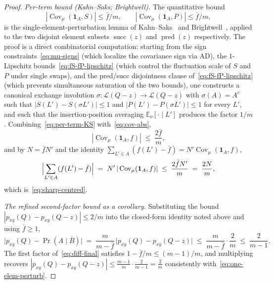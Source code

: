 \begin{proof}
\emph{Per-term bound (Kahn--Saks; Brightwell).} The quantitative
bound
\begin{equation}\label{eq:per-term-KS}
  |\operatorname{Cov}_\mu(\mathbf{1}_A, S)| \le \bar f/m,
  \qquad
  |\operatorname{Cov}_\mu(\mathbf{1}_A, P)| \le \bar f/m,
\end{equation}
is the single-element-perturbation lemma of
Kahn--Saks~\cite[Lemma~2.2]{KahnSaks1984} and
Brightwell~\cite[Theorem~4.1]{Brightwell1999}, applied to the two
disjoint element subsets $\operatorname{succ}(z)$ and
$\operatorname{pred}(z)$ respectively. The proof is a direct
combinatorial computation: starting from the sign
constraints~\eqref{eq:mu-signs} (which localize the covariance sign
via AD), the $1$-Lipschitz
bounds~\eqref{eq:fS-fP-lipschitz} (which control the fluctuation
scale of $S$ and $P$ under single swaps), and the pred/succ
disjointness clause of~\eqref{eq:fS-fP-lipschitz} (which prevents
simultaneous saturation of the two bounds), one constructs a
canonical exchange involution
$\sigma : \mathcal L(Q-z) \to \mathcal L(Q-z)$ with
$\sigma(A) = A^c$ such that $|S(L') - S(\sigma L')| \le 1$ and
$|P(L') - P(\sigma L')| \le 1$ for every $L'$, and such that the
insertion-position averaging $\mathbb E_\nu[\cdot \mid L']$ produces
the factor $1/m$. Combining~\eqref{eq:per-term-KS}
with~\eqref{eq:cov-abs},
\[
  |\operatorname{Cov}_\mu(\mathbf{1}_A, f)| \;\le\; \frac{2\bar f}{m},
\]
and by $N = \bar f N'$ and the identity
$\sum_{L' \in A}(f(L') - \bar f) = N' \operatorname{Cov}_\mu(\mathbf{1}_A, f)$,
\[
  \Bigl|\sum_{L' \in A}(f(L') - \bar f)\Bigr|
  \;=\; N'\,|\operatorname{Cov}_\mu(\mathbf{1}_A, f)|
  \;\le\; \frac{2\bar f N'}{m} \;=\; \frac{2N}{m},
\]
which is~\eqref{eq:sharp-centred}.

\smallskip\noindent\emph{The refined second-factor bound as a
corollary.} Substituting the bound $|p_{xy}(Q) - p_{xy}(Q-z)| \le 2/m$
into the closed-form identity noted above and using $\bar f \ge 1$,
\begin{equation}\label{eq:second-factor}
  \bigl|p_{xy}(Q) - \Pr(A \mid \bar B)\bigr|
  \;=\; \frac{m}{m - \bar f}\,\bigl|p_{xy}(Q) - p_{xy}(Q-z)\bigr|
  \;\le\; \frac{m}{m - \bar f}\cdot\frac{2}{m}
  \;\le\; \frac{2}{m - 1}.
\end{equation}
The first factor of~\eqref{eq:diff-final} satisfies
$1 - \bar f/m \le (m-1)/m$, and multiplying recovers
$|p_{xy}(Q) - p_{xy}(Q-z)| \le \frac{m-1}{m}\cdot\frac{2}{m-1}
= \frac{2}{m}$ consistently with~\eqref{eq:one-elem-perturb}.
\end{proof}

